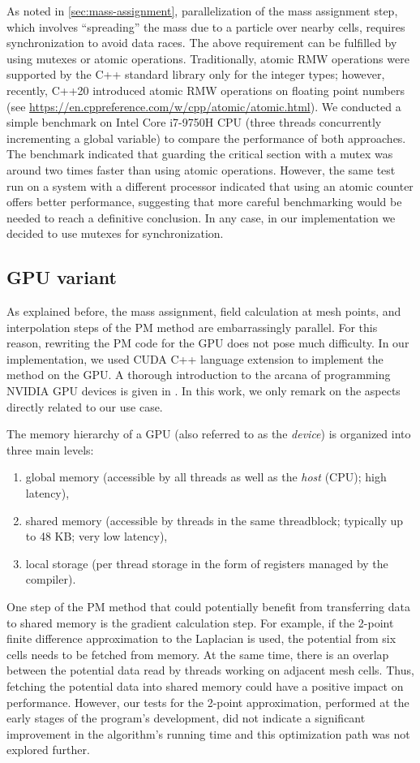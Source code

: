 As noted in \autoref{sec:mass-assignment}, parallelization of the mass assignment step, which involves ``spreading'' the mass due to a particle over nearby cells, requires synchronization to avoid data races.
The above requirement can be fulfilled by using mutexes or atomic operations.
Traditionally, atomic RMW operations were supported by the C++ standard library only for the integer types; however, recently, C++20 introduced atomic RMW operations on floating point numbers (see \url{https://en.cppreference.com/w/cpp/atomic/atomic.html}).
We conducted a simple benchmark on Intel Core i7-9750H CPU (three threads concurrently incrementing a global variable) to compare the performance of both approaches.
The benchmark indicated that guarding the critical section with a mutex was around two times faster than using atomic operations.
However, the same test run on a system with a different processor indicated that using an atomic counter offers better performance, suggesting that more careful benchmarking would be needed to reach a definitive conclusion.
In any case, in our implementation we decided to use mutexes for synchronization.

\subsection{GPU variant}\label{subsec:gpu-variant}
As explained before, the mass assignment, field calculation at mesh points, and interpolation steps of the PM method are embarrassingly parallel.
For this reason, rewriting the PM code for the GPU does not pose much difficulty.
In our implementation, we used CUDA C++ language extension to implement the method on the GPU.
A thorough introduction to the arcana of programming NVIDIA GPU devices is given in \cite{nvidia2025cuda}.
In this work, we only remark on the aspects directly related to our use case.

The memory hierarchy of a GPU (also referred to as the \textit{device}) is organized into three main levels:
\begin{enumerate}
    \item global memory (accessible by all threads as well as the \textit{host} (CPU); high latency),
    \item shared memory (accessible by threads in the same threadblock; typically up to 48 KB; very low latency),
    \item local storage (per thread storage in the form of registers managed by the compiler).
\end{enumerate}
One step of the PM method that could potentially benefit from transferring data to shared memory is the gradient calculation step.
For example, if the 2-point finite difference approximation to the Laplacian is used, the potential from six cells needs to be fetched from memory.
At the same time, there is an overlap between the potential data read by threads working on adjacent mesh cells.
Thus, fetching the potential data into shared memory could have a positive impact on performance.
However, our tests for the 2-point approximation, performed at the early stages of the program's development, did not indicate a significant improvement in the algorithm's running time and this optimization path was not explored further.

